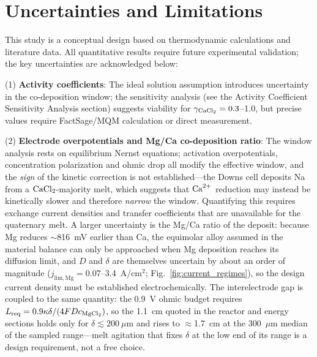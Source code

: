 \documentclass[pdflatex,sn-basic,Numbered]{sn-jnl}
\begin{document}
\section{Uncertainties and Limitations}\label{sec:limitations}

This study is a conceptual design based on thermodynamic calculations and literature data. All quantitative results require future experimental validation; the key uncertainties are acknowledged below:

(1) \textbf{Activity coefficients}: The ideal solution assumption introduces uncertainty in the co-deposition window; the sensitivity analysis (see the Activity Coefficient Sensitivity Analysis section) suggests viability for $\gamma_{\ce{CaCl2}} = 0.3$--1.0, but precise values require FactSage/MQM calculation or direct measurement.

(2) \textbf{Electrode overpotentials and Mg/Ca co-deposition ratio}: The window analysis rests on equilibrium Nernst equations; activation overpotentials, concentration polarization and ohmic drop all modify the effective window, and the \emph{sign} of the kinetic correction is not established---the Downs cell deposits Na from a $\ce{CaCl2}$-majority melt, which suggests that $\ce{Ca^{2+}}$ reduction may instead be kinetically slower and therefore \emph{narrow} the window. Quantifying this requires exchange current densities and transfer coefficients that are unavailable for the quaternary melt. A larger uncertainty is the Mg/Ca ratio of the deposit: because Mg reduces $\sim$816~mV earlier than Ca, the equimolar alloy assumed in the material balance can only be approached when Mg deposition reaches its diffusion limit, and $D$ and $\delta$ are themselves uncertain by about an order of magnitude ($j_{\mathrm{lim,Mg}} = 0.07$--3.4~A/cm$^2$; Fig.~\ref{fig:current_regimes}), so the design current density must be established electrochemically. The interelectrode gap is coupled to the same quantity: the 0.9~V ohmic budget requires $L_{\mathrm{req}} = 0.9\kappa\delta/(4FDc_{\ce{MgCl2}})$, so the 1.1~cm quoted in the reactor and energy sections holds only for $\delta \lesssim 200~\mu$m and rises to $\approx$1.7~cm at the 300~$\mu$m median of the sampled range---melt agitation that fixes $\delta$ at the low end of its range is a design requirement, not a free choice.
\end{document}

